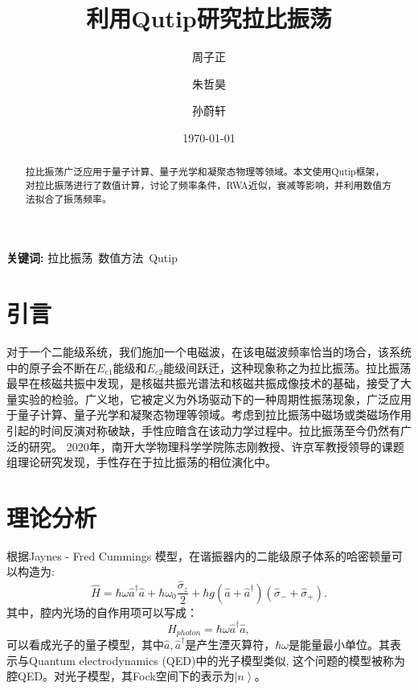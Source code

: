\documentclass{ctexart}
\title{利用Qutip研究拉比振荡}
\author[1]{周子正}
\author[2]{朱哲昊}
\author[3]{孙蔚轩}
\affil[1]{物理科学学院, 南开大学}
\affil[2]{物理科学学院, 南开大学}
\affil[3]{金融学院, 南开大学}
\date{\today}
\begin{document}
\maketitle

\begin{abstract}
    拉比振荡广泛应用于量子计算、量子光学和凝聚态物理等领域。本文使用Qutip框架，对拉比振荡进行了数值计算，讨论了频率条件，RWA近似，衰减等影响，并利用数值方法拟合了振荡频率。
\end{abstract}

\textbf{关键词:} 拉比振荡\ 数值方法\ Qutip

\section{引言}
对于一个二能级系统，我们施加一个电磁波，在该电磁波频率恰当的场合，该系统中的原子会不断在$E_{e1}$能级和$E_{e2}$能级间跃迁，这种现象称之为拉比振荡\cite{zhu_vacuum_1990}。拉比振荡最早在核磁共振中发现，是核磁共振光谱法和核磁共振成像技术的基础，接受了大量实验的检验\cite{brune_quantum_1996}。广义地，它被定义为外场驱动下的一种周期性振荡现象，广泛应用于量子计算、量子光学和凝聚态物理等领域。考虑到拉比振荡中磁场或类磁场作用引起的时间反演对称破缺，手性应暗含在该动力学过程中。拉比振荡至今仍然有广泛的研究。
2020年，南开大学物理科学学院陈志刚教授、许京军教授领导的课题组理论研究发现，手性存在于拉比振荡的相位演化中\cite{zhang_unveiling_2020}。
\section{理论分析}
根据Jaynes - Fred Cummings 模型\cite{jaynes_comparison_1963}\cite{cummings_reminiscing_2013}，在谐振器内的二能级原子体系的哈密顿量可以构造为:
\begin{equation}
    \hat{H}=\hbar \omega \hat{a}^{\dagger} \hat{a}+\hbar \omega_{0} \frac{\hat{\sigma}_{z}}{2}+\hbar g\left(\hat{a} +\hat{a}^{\dagger} \right)\left(\hat{\sigma}_{-}+\hat{\sigma}_{+}\right).
    \label{equ:H}
\end{equation}
其中，腔内光场的自作用项可以写成：
\begin{equation}
    \hat{H}_{photon}=\hbar \omega \hat{a}^{\dagger} \hat{a},
    \label{equ:photon}
\end{equation}
可以看成光子的量子模型，其中$\hat{a},\hat{a}^\dagger$是产生湮灭算符，$\hbar\omega$是能量最小单位。其表示与Quantum electrodynamics (QED)中的光子模型类似, 这个问题的模型被称为腔QED。对光子模型，其Fock空间下的表示为$\left|n\right>$。
\end{document}
